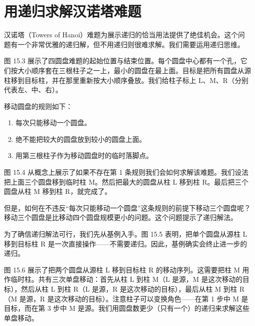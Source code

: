 \section{用递归求解汉诺塔难题}

汉诺塔（Towers of Hanoi）难题为展示递归的恰当用法提供了绝佳机会。这个问题有一个非常优雅的递归解，但不用递归则很难求解。我们需要运用递归思维。

图 15.3 展示了四圆盘难题的起始位置与结束位置。每个圆盘中心都有一个孔，它们按大小顺序套在三根柱子之一上，最小的圆盘在最上面。目标是把所有圆盘从源柱移到目标柱，并在那里重新按大小顺序叠放。我们给柱子标上 L、M、R（分别代表左、中、右）。


移动圆盘的规则如下：

\begin{enumerate}
\item 每次只能移动一个圆盘。
\item 绝不能把较大的圆盘放到较小的圆盘上面。
\item 用第三根柱子作为移动圆盘时的临时落脚点。
\end{enumerate}

图 15.4 从概念上展示了如果不存在第 1 条规则我们会如何求解该难题。我们设法把上面三个圆盘移到临时柱 M。然后把最大的圆盘从柱 L 移到柱 R。最后把三个圆盘从柱 M 移到柱 R，就完成了。


但是，如何在不违反“每次只能移动一个圆盘”这条规则的前提下移动三个圆盘呢？移动三个圆盘是比移动四个圆盘规模更小的问题。这个问题提示了递归解法。

为了确信递归解法可行，我们先从基例入手。图 15.5 表明，把单个圆盘从源柱 L 移到目标柱 R 是一次直接操作——不需要递归。因此，基例确实会终止进一步的递归。


图 15.6 展示了把两个圆盘从源柱 L 移到目标柱 R 的移动序列。这需要把柱 M 用作临时柱。共有三次单盘移动：首先从柱 L 到柱 M（L 是源，M 是这次移动的目标），然后从柱 L 到柱 R（L 是源，R 是这次移动的目标），最后从柱 M 到柱 R（M 是源，R 是这次移动的目标）。注意柱子可以变换角色——在第 1 步中 M 是目标，而在第 3 步中 M 是源。我们用圆盘数更少（只有一个）的递归来求解这些单盘移动。


